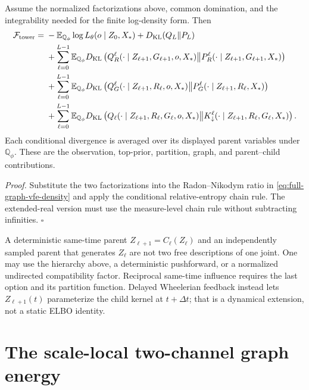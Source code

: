 Assume the normalized factorizations above, common domination, and the
integrability needed for the finite log-density form. Then
\begin{align}
\mathcal F_{\mathrm{tower}}
={}&-\mathbb E_{\mathbb Q_\phi}\log L_\theta(o\mid Z_0,X_*)
+D_{\mathrm{KL}}(Q_L\Vert P_L)
\nonumber\\
&+\sum_{\ell=0}^{L-1}\mathbb E_{\mathbb Q_\phi}
D_{\mathrm{KL}}\left(Q_R^\ell(\cdot\mid Z_{\ell+1},G_{\ell+1},o,X_*)
\middle\Vert P_R^\ell(\cdot\mid Z_{\ell+1},G_{\ell+1},X_*)\right)
\nonumber\\
&+\sum_{\ell=0}^{L-1}\mathbb E_{\mathbb Q_\phi}
D_{\mathrm{KL}}\left(Q_G^\ell(\cdot\mid Z_{\ell+1},R_\ell,o,X_*)
\middle\Vert P_G^\ell(\cdot\mid Z_{\ell+1},R_\ell,X_*)\right)
\nonumber\\
&+\sum_{\ell=0}^{L-1}\mathbb E_{\mathbb Q_\phi}
D_{\mathrm{KL}}\left(Q_\ell(\cdot\mid Z_{\ell+1},R_\ell,G_\ell,o,X_*)
\middle\Vert K_\downarrow^\ell(\cdot\mid Z_{\ell+1},R_\ell,G_\ell,X_*)\right).
\label{eq:full-graph-vfe-factorized}
\end{align}
Each conditional divergence is averaged over its displayed parent variables
under $\mathbb Q_\phi$. These are the observation, top-prior, partition,
graph, and parent--child contributions. 

\noindent\emph{Proof.}
Substitute the two factorizations into the Radon--Nikodym ratio in
\eqref{eq:full-graph-vfe-density} and apply the conditional relative-entropy
chain rule. The extended-real version must use the measure-level chain rule
without subtracting infinities. \hfill$\square$

A deterministic same-time parent $Z_{\ell+1}=C_\ell(Z_\ell)$ and an
independently sampled parent that generates $Z_\ell$ are not two free
descriptions of one joint. One may use the hierarchy above, a deterministic
pushforward, or a normalized undirected compatibility factor. Reciprocal
same-time influence
requires the last option and its partition function. Delayed Wheelerian
feedback instead lets $Z_{\ell+1}(t)$ parameterize the child kernel at
$t+\Delta t$; that is a dynamical extension, not a static ELBO identity.

\section{The scale-local two-channel graph energy}
\label{sec:full-graph-vfe-scale-local}

